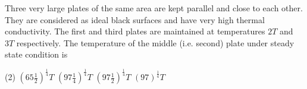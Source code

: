 
\item Three very large plates of the same area are kept parallel and close to each other.
They are considered as ideal black surfaces and have very high thermal conductivity.
The first and third plates are maintained at temperatures \(2T\) and \(3T\) respectively.
The temperature of the middle (i.e. second) plate under steady state condition is
    \begin{tasks}(2)
        \task \(\left(65\frac{1}{2}\right)^{\frac{1}{4}}T\)
        \task \(\left(97\frac{1}{4}\right)^{\frac{1}{4}}T\)
        \task \(\left(97\frac{1}{2}\right)^{\frac{1}{4}}T\)
        \task \((97)^{\frac{1}{4}}T\)
    \end{tasks}
